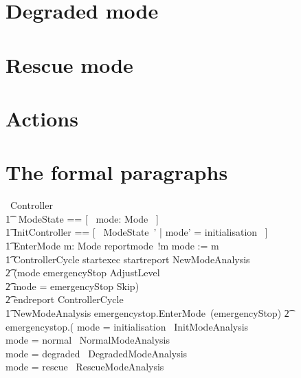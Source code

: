 \documentclass{report} %
\begin{document}
\section{Degraded mode}
\section{Rescue mode}

\section{Actions}

\section{The formal paragraphs}

\begin{circus}
    \circprocess\ Controller \circdef \circbegin \\
        \t1 \circstate\ ModeState == [~ mode: Mode ~] \\
        \t1 InitController == [~ ModeState~' | mode' = initialisation ~] \\
        \t1 EnterMode \circdef m: Mode \circspot reportmode~!m \then mode := m \\
        \t1 ControllerCycle \circdef startexec \then startreport \then NewModeAnalysis \circseq\ \\
                \t2 (\lcircguard mode \neq emergencyStop \rcircguard \circguard AdjustLevel \extchoice \\
                \t2 \lcircguard mode = emergencyStop \rcircguard \circguard Skip) \circseq \\
                \t2 endreport \then ControllerCycle \\
        \t1 NewModeAnalysis \circdef emergencystop.\true \then EnterMode~(emergencyStop)
            \t2 \extchoice
            emergencystop.\false \then (
                \lcircguard mode = initialisation \rcircguard \circguard\ InitModeAnalysis \\
                \extchoice \lcircguard mode = normal \rcircguard \circguard\ NormalModeAnalysis \\
                \extchoice \lcircguard mode = degraded \rcircguard \circguard\ DegradedModeAnalysis \\
                \extchoice \lcircguard mode = rescue \rcircguard \circguard\ RescueModeAnalysis \\

\end{circus}
\end{document}
